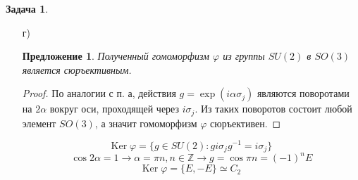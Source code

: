 \documentclass[12pt]{article}
\newtheorem{predl}[theorem]{Предложение}
\theoremstyle{definition}
\newtheorem{zad}{Задача}[section]
\begin{document}
\begin{zad}
\begin{itemize}
    \item[г)]
    \begin{predl}
        Полученный гомоморфизм $\varphi$ из группы $SU(2)$ в $SO(3)$ является сюръективным.
    \end{predl}
    \begin{proof}
    По аналогии с п. а, действия $g=\exp(i\alpha\sigma_j)$ являются поворотами на $2\alpha$ вокруг оси, проходящей через $i\sigma_j$. Из таких поворотов состоит любой элемент $SO(3)$, а значит гомоморфизм $\varphi$ сюръективен.
    \end{proof}
    \begin{equation}
        \text{Ker}\;\varphi=\{g\in SU(2):gi\sigma_jg^{-1}=i\sigma_j\}
    \end{equation}
    \begin{equation}
        \cos 2\alpha = 1\rightarrow\alpha=\pi n, n\in\mathbb{Z}\rightarrow g=\cos\pi n=(-1)^nE
    \end{equation}
    \begin{equation}
        \boxed{\text{Ker}\;\varphi=\{E,-E\}\simeq C_2}
    \end{equation}
\end{itemize}
\end{zad}
\end{document}
